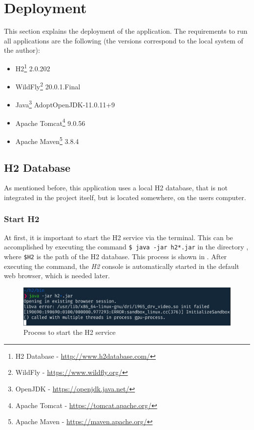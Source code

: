 \newpage
\section{Deployment}\label{sec:03_depl}
This section explains the deployment of the application.
The requirements to run all applications are the following (the versions correspond to the local system of the author):
\begin{itemize}
\item H2\footnote{H2 Database - \url{http://www.h2database.com/}} 2.0.202
\item WildFly\footnote{WildFly - \url{https://www.wildfly.org/}} 20.0.1.Final
\item Java\footnote{OpenJDK - \url{https://openjdk.java.net/}} AdoptOpenJDK-11.0.11+9
\item Apache Tomcat\footnote{Apache Tomcat - \url{https://tomcat.apache.org/}} 9.0.56
\item Apache Maven\footnote{Apache Maven - \url{https://maven.apache.org/}} 3.8.4
\end{itemize}


\subsection{H2 Database}\label{sec:03_depl_h2}
As mentioned before, this application uses a local H2 database, that is not integrated in the project itself, but is located somewhere, on the users computer.

\subsubsection{Start H2}\label{sec:03_depl_h2_start}
At first, it is important to start the H2 service via the terminal. This can be accomplished by executing the command \texttt{\$ java -jar h2*.jar} in the directory , where \texttt{\$H2} is the path of the H2 database. This process is shown in . After executing the command, the \textit{H2} console is automatically started in the default web browser, which is needed later.
\begin{figure}[h]
\centering
\includegraphics[scale=0.23]{images/03_depl/h2_start}
\caption{Process to start the H2 service}
\label{fig:03_depl_h2_h2start}
\end{figure}


